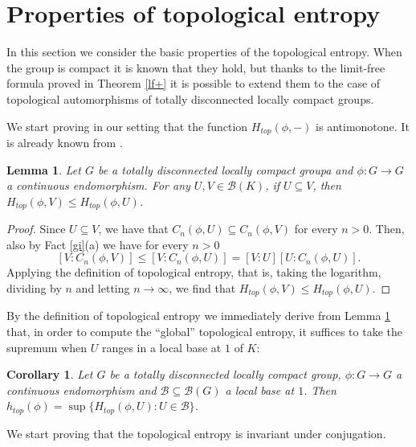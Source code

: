 \documentclass[11pt]{article}
\newtheorem{lemma}[theorem]{Lemma}
\newtheorem{corollary}[theorem]{Corollary}
\theoremstyle{definition}
\numberwithin{equation}{section}
\begin{document}
\section{Properties of topological entropy}\label{prop-sec}

In this section we consider the basic properties of the topological entropy. When the group is compact it is known that they hold, but thanks to the limit-free formula proved in Theorem \ref{lf+} it is possible to extend them to the case of topological automorphisms of totally disconnected locally compact groups.

\medskip
We start proving in our setting that the function $H_{top}(\phi,-)$ is antimonotone. It is already known from \cite{DG-islam}.

\begin{lemma}\label{antim}
Let $G$ be a totally disconnected locally compact groupa and $\phi:G\to G$ a continuous endomorphism.
For any $U,V\in\mathcal B(K)$, if $U\subseteq V$, then $H_{top}(\phi,V)\leq H_{top}(\phi,U)$.
\end{lemma}
\begin{proof}
Since $U\subseteq V$, we have that $C_n(\phi,U)\subseteq C_n(\phi,V)$ for every $n>0$. Then, also by Fact \ref{gi}(a) we have for every $n>0$
$$[V:C_n(\phi,V)]\leq[V:C_n(\phi,U)]=[V:U][U:C_n(\phi,U)].$$
Applying the definition of topological entropy, that is, taking the logarithm, dividing by $n$ and letting $n\to\infty$, we find that $H_{top}(\phi,V)\leq H_{top}(\phi,U)$.
\end{proof}

By the definition of topological entropy we immediately derive from Lemma \ref{antim} that, in order to compute the ``global'' topological entropy, it suffices to take the supremum when $U$ ranges in a local base at $1$ of $K$:

\begin{corollary}\label{basesuff}
Let $G$ be a totally disconnected locally compact group, $\phi:G\to G$ a continuous endomorphism and $\mathcal B\subseteq \mathcal B(G)$ a local base at $1$. Then $h_{top}(\phi)=\sup\{H_{top}(\phi,U):U\in\mathcal B\}$.
\end{corollary}

We start proving that the topological entropy is invariant under conjugation.
\end{document}
